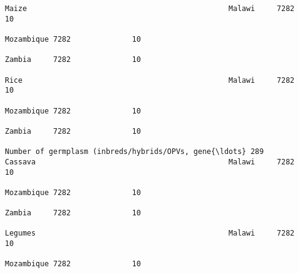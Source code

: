 \documentclass[11pt]{article}
\begin{document}
\begin{Verbatim}[commandchars=\\\{\}]
                                                                                                                                                              Maize                                              Malawi     7282              10  
                                                                                                                                                                                                                 Mozambique 7282              10  
                                                                                                                                                                                                                 Zambia     7282              10  
                                                                                                                                                              Rice                                               Malawi     7282              10  
                                                                                                                                                                                                                 Mozambique 7282              10  
                                                                                                                                                                                                                 Zambia     7282              10  
                                                                         Number of germplasm (inbreds/hybrids/OPVs, gene{\ldots} 289                               Cassava                                            Malawi     7282              10  
                                                                                                                                                                                                                 Mozambique 7282              10  
                                                                                                                                                                                                                 Zambia     7282              10  
                                                                                                                                                              Legumes                                            Malawi     7282              10  
                                                                                                                                                                                                                 Mozambique 7282              10  

\end{Verbatim}
\end{document}
